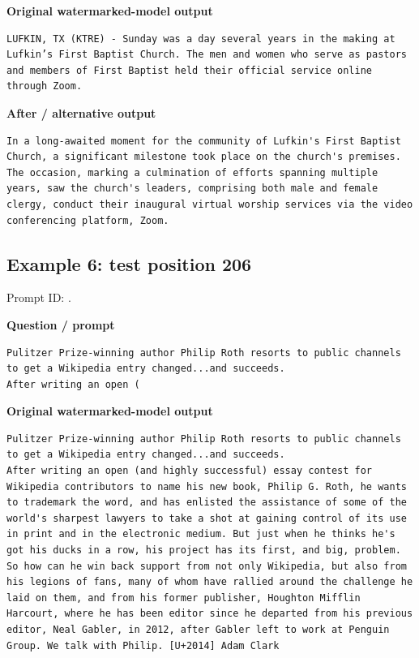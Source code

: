 \textbf{Original watermarked-model output}

\begin{Verbatim}
LUFKIN, TX (KTRE) - Sunday was a day several years in the making at Lufkin’s First Baptist Church. The men and women who serve as pastors and members of First Baptist held their official service online through Zoom.
\end{Verbatim}

\textbf{After / alternative output}

\begin{Verbatim}
In a long-awaited moment for the community of Lufkin's First Baptist Church, a significant milestone took place on the church's premises. The occasion, marking a culmination of efforts spanning multiple years, saw the church's leaders, comprising both male and female clergy, conduct their inaugural virtual worship services via the video conferencing platform, Zoom.
\end{Verbatim}

\subsection{Example 6: test position
206}\label{record-docs-watermarking-qualitative-paper-sir-bira-md-example-6-test-position-206}

Prompt ID:
\texttt{}.

\textbf{Question / prompt}

\begin{Verbatim}
Pulitzer Prize-winning author Philip Roth resorts to public channels to get a Wikipedia entry changed...and succeeds.
After writing an open (
\end{Verbatim}

\textbf{Original watermarked-model output}

\begin{Verbatim}
Pulitzer Prize-winning author Philip Roth resorts to public channels to get a Wikipedia entry changed...and succeeds.
After writing an open (and highly successful) essay contest for Wikipedia contributors to name his new book, Philip G. Roth, he wants to trademark the word, and has enlisted the assistance of some of the world's sharpest lawyers to take a shot at gaining control of its use in print and in the electronic medium. But just when he thinks he's got his ducks in a row, his project has its first, and big, problem. So how can he win back support from not only Wikipedia, but also from his legions of fans, many of whom have rallied around the challenge he laid on them, and from his former publisher, Houghton Mifflin Harcourt, where he has been editor since he departed from his previous editor, Neal Gabler, in 2012, after Gabler left to work at Penguin Group. We talk with Philip. [U+2014] Adam Clark
\end{Verbatim}

